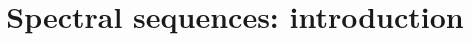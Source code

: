 \documentclass{ximera}
\title{Spectral sequences: introduction}
\begin{document}
\begin{abstract}

\end{abstract}
\maketitle

\end{document}
